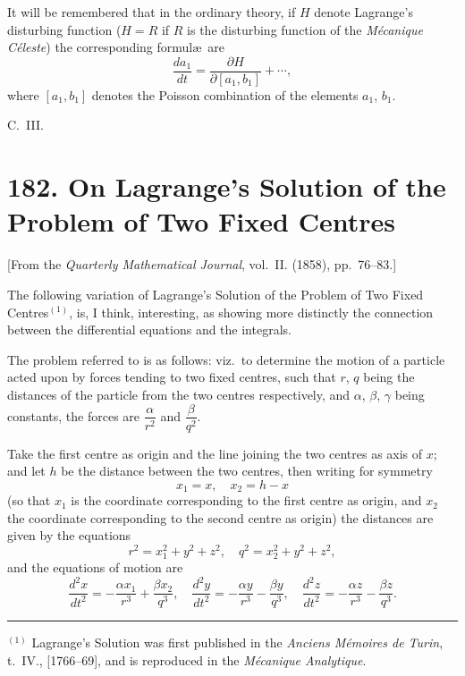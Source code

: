 \documentclass[11pt,a4paper]{book}
\begin{document}
It will be remembered that in the ordinary theory, if $H$ denote Lagrange's disturbing function ($H = R$ if $R$ is the disturbing function of the \textit{M\'{e}canique C\'{e}leste}) the corresponding formul\ae\ are
\[
\frac{da_1}{dt} = \frac{\partial H}{\partial [a_1, b_1]} + \cdots,
\]
where $[a_1, b_1]$ denotes the Poisson combination of the elements $a_1$, $b_1$.

\begin{flushright}
C.~III.
\end{flushright}


\newpage
\section*{182. On Lagrange's Solution of the Problem of Two Fixed Centres}

[From the \textit{Quarterly Mathematical Journal}, vol.~II. (1858), pp.~76--83.]

The following variation of Lagrange's Solution of the Problem of Two Fixed Centres$^{(1)}$, is, I think, interesting, as showing more distinctly the connection between the differential equations and the integrals.

The problem referred to is as follows: viz.\ to determine the motion of a particle acted upon by forces tending to two fixed centres, such that $r$, $q$ being the distances of the particle from the two centres respectively, and $\alpha$, $\beta$, $\gamma$ being constants, the forces are $\dfrac{\alpha}{r^2}$ and $\dfrac{\beta}{q^2}$.

Take the first centre as origin and the line joining the two centres as axis of $x$; and let $h$ be the distance between the two centres, then writing for symmetry
\[
x_1 = x, \quad x_2 = h - x
\]
(so that $x_1$ is the coordinate corresponding to the first centre as origin, and $x_2$ the coordinate corresponding to the second centre as origin) the distances are given by the equations
\[
r^2 = x_1^2 + y^2 + z^2, \quad q^2 = x_2^2 + y^2 + z^2,
\]
and the equations of motion are
\[
\frac{d^2x}{dt^2} = -\frac{\alpha x_1}{r^3} + \frac{\beta x_2}{q^3}, \quad
\frac{d^2y}{dt^2} = -\frac{\alpha y}{r^3} - \frac{\beta y}{q^3}, \quad
\frac{d^2z}{dt^2} = -\frac{\alpha z}{r^3} - \frac{\beta z}{q^3}.
\]

\rule{0.5\textwidth}{0.4pt}

$^{(1)}$ Lagrange's Solution was first published in the \textit{Anciens M\'{e}moires de Turin}, t.~IV., [1766--69], and is reproduced in the \textit{M\'{e}canique Analytique}.
\end{document}
